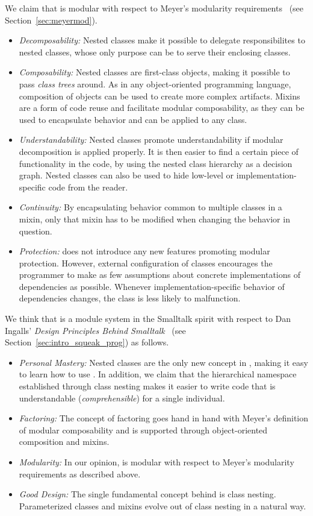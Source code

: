 We claim that \msname is modular with respect to Meyer's modularity requirements~\cite{myers1978composite} (see Section~\ref{sec:meyermod}).
\begin{itemize}
	\item \emph{Decomposability:} Nested classes make it possible to delegate responsibilites to nested classes, whose only purpose can be to serve their enclosing classes.
	\item \emph{Composability:} Nested classes are first-class objects, making it possible to pass \emph{class trees} around. As in any object-oriented programming language, composition of objects can be used to create more complex artifacts. Mixins are a form of code reuse and facilitate modular composability, as they can be used to encapsulate  behavior and can be applied to any class.
	\item \emph{Understandability:} Nested classes promote understandability if modular decomposition is applied properly. It is then easier to find a certain piece of functionality in the code, by using the nested class hierarchy as a decision graph. Nested classes can also be used to hide low-level or implementation-specific code from the reader.
	\item \emph{Continuity:} By encapsulating behavior common to multiple classes in a mixin, only that mixin has to be modified when changing the behavior in question.
	\item \emph{Protection:} \msname does not introduce any new features promoting modular protection. However, external configuration of classes encourages the programmer to make as few assumptions about concrete implementations of dependencies as possible. Whenever implementation-specific behavior of dependencies changes, the class is less likely to malfunction.
\end{itemize}

\newpage

We think that \msname is a module system in the Smalltalk spirit with respect to Dan Ingalls' \emph{Design Principles Behind Smalltalk}~\cite{Inga81a} (see Section~\ref{sec:intro_squeak_prog}) as follows.
\begin{itemize}
	\item \emph{Personal Mastery:} Nested classes are the only new concept in \msname, making it easy to learn how to use \msname. In addition, we claim that the hierarchical namespace established through class nesting makes it easier to write code that is understandable (\emph{comprehensible}) for a single individual.
	\item \emph{Factoring:} The concept of factoring goes hand in hand with Meyer's definition of modular composability and is supported through object-oriented composition and mixins.
	\item \emph{Modularity:} In our opinion, \msname is modular with respect to Meyer's modularity requirements as described above.
	\item \emph{Good Design:} The single fundamental concept behind \msname is class nesting. Parameterized classes and mixins evolve out of class nesting in a natural way.
\end{itemize}

